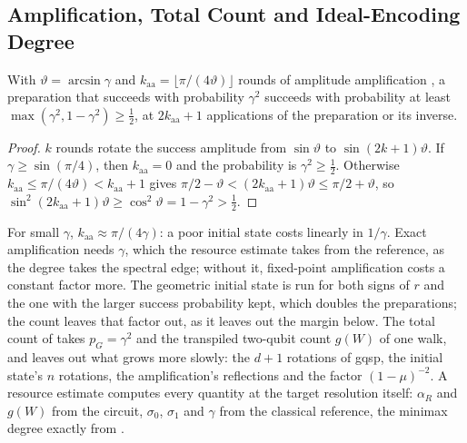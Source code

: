 \subsection{Amplification, Total Count and Ideal-Encoding Degree}
\label{app:amplification}

\begin{proposition}[Amplification]
With $\vartheta=\arcsin\gamma$ and $k_{\mathrm{aa}}=\lfloor\pi/(4\vartheta)\rfloor$ rounds of amplitude amplification \cite{brassard2000amplitude}, a preparation that succeeds with probability $\gamma^2$ succeeds with probability at least $\max(\gamma^2,1-\gamma^2)\ge\tfrac12$, at $2k_{\mathrm{aa}}+1$ applications of the preparation or its inverse.
\end{proposition}
\begin{proof}
$k$ rounds rotate the success amplitude from $\sin\vartheta$ to $\sin(2k+1)\vartheta$. If $\gamma\ge\sin(\pi/4)$, then $k_{\mathrm{aa}}=0$ and the probability is $\gamma^2\ge\tfrac12$. Otherwise $k_{\mathrm{aa}}\le\pi/(4\vartheta)<k_{\mathrm{aa}}+1$ gives $\pi/2-\vartheta<(2k_{\mathrm{aa}}+1)\vartheta\le\pi/2+\vartheta$, so $\sin^2(2k_{\mathrm{aa}}+1)\vartheta\ge\cos^2\vartheta=1-\gamma^2>\tfrac12$.
\end{proof}

For small $\gamma$, $k_{\mathrm{aa}}\approx\pi/(4\gamma)$: a poor initial state costs linearly in $1/\gamma$. Exact amplification needs $\gamma$, which the resource estimate takes from the reference, as the degree takes the spectral edge; without it, fixed-point amplification costs a constant factor more. The geometric initial state is run for both signs of $r$ and the one with the larger success probability kept, which doubles the preparations; the count leaves that factor out, as it leaves out the margin below. The total count of  takes $p_G=\gamma^2$ and the transpiled two-qubit count $g(W)$ of one walk, and leaves out what grows more slowly: the $d+1$ rotations of \gls{gqsp}, the initial state's $n$ rotations, the amplification's reflections and the factor $(1-\mu)^{-2}$. A resource estimate computes every quantity at the target resolution itself: $\alpha_R$ and $g(W)$ from the circuit, $\sigma_0$, $\sigma_1$ and $\gamma$ from the classical reference, the minimax degree exactly from .

